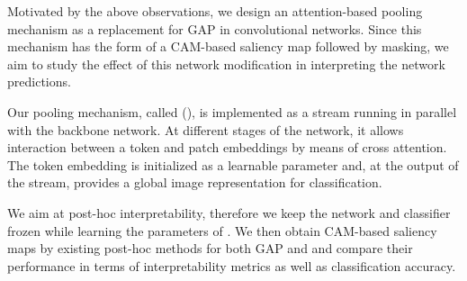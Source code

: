 Motivated by the above observations, we design an attention-based pooling mechanism as a replacement for GAP in
convolutional networks. Since this mechanism has the form of a CAM-based saliency map followed by masking, we aim to
study the effect of this network modification in interpreting the network predictions.

Our pooling mechanism, called \emph{\OURS} (\emph{\Ours}), is implemented as a stream running in parallel with the
backbone network. At different stages of the network, it allows interaction between a \cls token and patch embeddings by
means of cross attention. The \cls token embedding is initialized as a learnable parameter and, at the output of the
stream, provides a global image representation for classification.

We aim at post-hoc interpretability, therefore we keep the network and classifier frozen while learning the parameters
of \Ours. We then obtain CAM-based saliency maps by existing post-hoc methods for both GAP and \Ours and compare their
performance in terms of interpretability metrics as well as classification accuracy.

